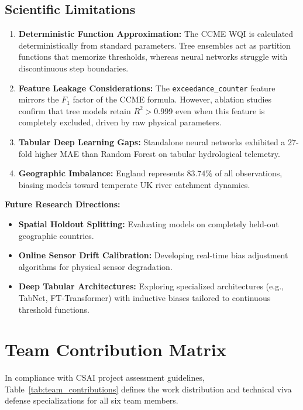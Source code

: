 \documentclass[conference]{IEEEtran}
\begin{document}
\subsection{Scientific Limitations}
\begin{enumerate}
  \item \textbf{Deterministic Function Approximation:} The CCME WQI is calculated deterministically from standard parameters. Tree ensembles act as partition functions that memorize thresholds, whereas neural networks struggle with discontinuous step boundaries.
  \item \textbf{Feature Leakage Considerations:} The \texttt{exceedance\_counter} feature mirrors the $F_1$ factor of the CCME formula. However, ablation studies confirm that tree models retain $R^2 > 0.999$ even when this feature is completely excluded, driven by raw physical parameters.
  \item \textbf{Tabular Deep Learning Gaps:} Standalone neural networks exhibited a 27-fold higher MAE than Random Forest on tabular hydrological telemetry.
  \item \textbf{Geographic Imbalance:} England represents $83.74\%$ of all observations, biasing models toward temperate UK river catchment dynamics.
\end{enumerate}

\noindent\textbf{Future Research Directions:}
\begin{itemize}
  \item \textbf{Spatial Holdout Splitting:} Evaluating models on completely held-out geographic countries.
  \item \textbf{Online Sensor Drift Calibration:} Developing real-time bias adjustment algorithms for physical sensor degradation.
  \item \textbf{Deep Tabular Architectures:} Exploring specialized architectures (e.g., TabNet, FT-Transformer) with inductive biases tailored to continuous threshold functions.
\end{itemize}

\section{Team Contribution Matrix}
\label{sec:team}

In compliance with CSAI project assessment guidelines, Table~\ref{tab:team_contributions} defines the work distribution and technical viva defense specializations for all six team members.
\end{document}
